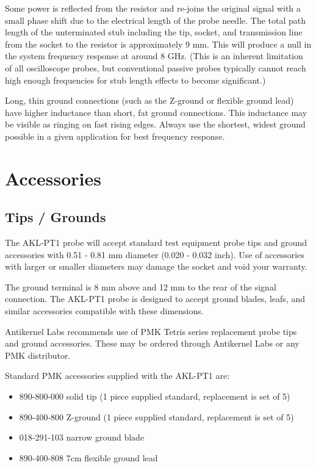 \documentclass[11pt]{article}
\begin{document}
Some power is reflected from the resistor and re-joins the original signal with a small phase shift due to the
electrical length of the probe needle. The total path length of the unterminated stub including the tip, socket, and
transmission line from the socket to the resistor is approximately 9 mm. This will produce a null in the system
frequency response at around 8 GHz. (This is an inherent limitation of all oscilloscope probes, but conventional
passive probes typically cannot reach high enough frequencies for stub length effects to become significant.)

Long, thin ground connections (such as the Z-ground or flexible ground lead) have higher inductance than short, fat
ground connections. This inductance may be visible as ringing on fast rising edges. Always use the shortest, widest
ground possible in a given application for best frequency response.

\section{Accessories}

\subsection{Tips / Grounds}

The AKL-PT1 probe will accept standard test equipment probe tips and ground accessories with 0.51 - 0.81 mm diameter
(0.020 - 0.032 inch). Use of accessories with larger or smaller diameters may damage the socket and void your warranty.

The ground terminal is 8 mm above and 12 mm to the rear of the signal connection. The AKL-PT1 probe is designed to
accept ground blades, leafs, and similar accessories compatible with these dimensions.

Antikernel Labs recommends use of PMK Tetris \textregistered series replacement probe tips and ground accessories.
These may be ordered through Antikernel Labs or any PMK distributor.

Standard PMK accessories supplied with the AKL-PT1 are:
\begin{itemize}
\item 890-800-000 solid tip (1 piece supplied standard, replacement is set of 5)
\item 890-400-800 Z-ground (1 piece supplied standard, replacement is set of 5)
\item 018-291-103 narrow ground blade
\item 890-400-808 7cm flexible ground lead
\end{itemize}
\end{document}
